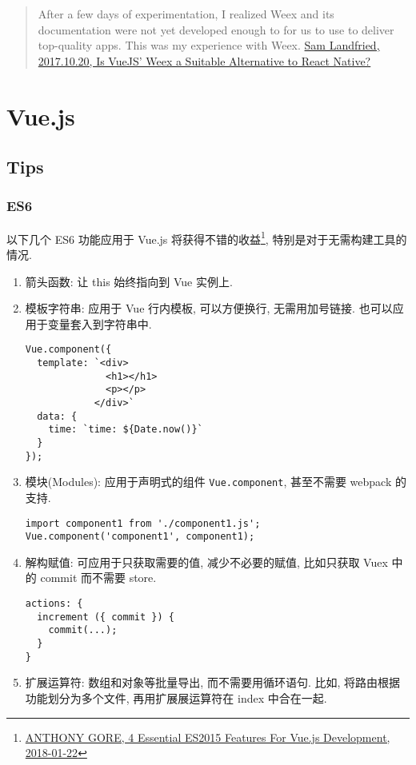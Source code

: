 \begin{quote}
After a few days of experimentation, I realized Weex and its
documentation were not yet developed enough to for us to use to deliver
top-quality apps. This was my experience with Weex.
\href{https://www.bignerdranch.com/blog/is-vuejs-weex-a-suitable-alternative-to-react-native/}{Sam
Landfried, 2017.10.20, Is VueJS' Weex a Suitable Alternative to React
Native?}
\end{quote}

\section{Vue.js}\label{vue.js}

\subsection{Tips}\label{tips-1}

\subsubsection{ES6}\label{es6}

以下几个 ES6 功能应用于 Vue.js 将获得不错的收益\footnote{\href{https://vuejsdevelopers.com/2018/01/22/vue-js-javascript-es6/}{ANTHONY
  GORE, 4 Essential ES2015 Features For Vue.js Development, 2018-01-22}},
特别是对于无需构建工具的情况.

\begin{enumerate}
\def\labelenumi{\arabic{enumi}.}
\item
  箭头函数: 让 this 始终指向到 Vue 实例上.
\item
  模板字符串: 应用于 Vue 行内模板, 可以方便换行, 无需用加号链接.
  也可以应用于变量套入到字符串中.

\begin{lstlisting}
Vue.component({
  template: `<div>
              <h1></h1>
              <p></p>
            </div>`
  data: {
    time: `time: ${Date.now()}`
  }
});
\end{lstlisting}
\item
  模块(Modules): 应用于声明式的组件 \lstinline!Vue.component!,
  甚至不需要 webpack 的支持.

\begin{lstlisting}
import component1 from './component1.js';
Vue.component('component1', component1);
\end{lstlisting}
\item
  解构赋值: 可应用于只获取需要的值, 减少不必要的赋值, 比如只获取 Vuex
  中的 commit 而不需要 store.

\begin{lstlisting}
actions: {
  increment ({ commit }) {
    commit(...);
  }
}
\end{lstlisting}
\item
  扩展运算符: 数组和对象等批量导出, 而不需要用循环语句. 比如,
  将路由根据功能划分为多个文件, 再用扩展展运算符在 index 中合在一起.
\end{enumerate}

